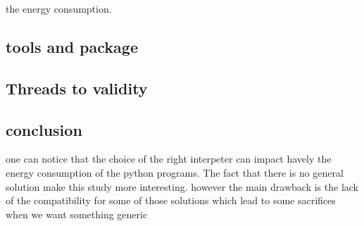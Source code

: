 the energy consumption.




\subsection{tools and package}

\subsection{Threads to validity}

\subsection{conclusion}

one can notice that the choice of the right interpeter can impact havely the energy consumption of the python programs. The fact that there is no general solution make this study more interesting. however the main drawback is the lack of the compatibility for some of those solutions which lead to some sacrifices when we want something generic